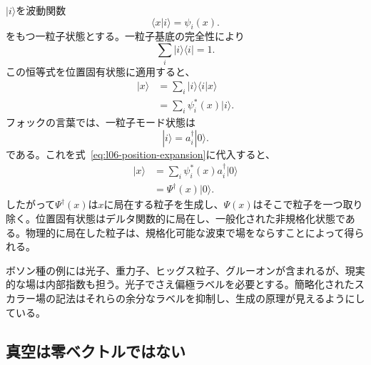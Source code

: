 \(|i\rangle\)を波動関数
\begin{equation}
\langle x|i\rangle=\psi_i(x).
\end{equation}
をもつ一粒子状態とする。一粒子基底の完全性により
\begin{equation}
\sum_i|i\rangle\langle i|=1.
\label{eq:l06-completeness}
\end{equation}
この恒等式を位置固有状態に適用すると、
\begin{align}
|x\rangle
&=\sum_i|i\rangle\langle i|x\rangle \\
&=\sum_i\psi_i^*(x)|i\rangle.
\label{eq:l06-position-expansion}
\end{align}
フォックの言葉では、一粒子モード状態は
\begin{equation}
|i\rangle=a_i^\dagger|0\rangle.
\end{equation}
である。これを式~\eqref{eq:l06-position-expansion}に代入すると、
\begin{align}
|x\rangle
&=\sum_i\psi_i^*(x)a_i^\dagger|0\rangle \\
&=\Psi^\dagger(x)|0\rangle.
\label{eq:l06-local-creation}
\end{align}
したがって\(\Psi^\dagger(x)\)は\(x\)に局在する粒子を生成し、\(\Psi(x)\)はそこで粒子を一つ取り除く。位置固有状態はデルタ関数的に局在し、一般化された非規格化状態である。物理的に局在した粒子は、規格化可能な波束で場をならすことによって得られる。

\begin{classroomqa}
\end{classroomqa}

ボソン種の例には光子、重力子、ヒッグス粒子、グルーオンが含まれるが、現実的な場は内部指数も担う。光子でさえ偏極ラベルを必要とする。簡略化されたスカラー場の記法はそれらの余分なラベルを抑制し、生成の原理が見えるようにしている。

\subsection{真空は零ベクトルではない}

